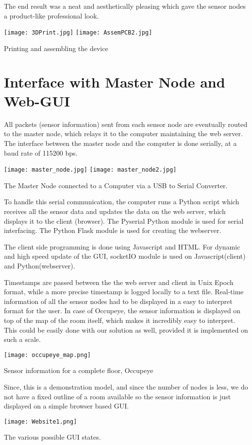The end result was a neat and aesthetically pleasing which gave the sensor nodes a product-like professional look.

\begin{center}
	
	
	\texttt{[image: 3DPrint.jpg]}
	\texttt{[image: AssemPCB2.jpg]}
	
	Printing and assembling the device
\end{center}



\section{Interface with Master Node and Web-GUI}

All packets (sensor information) sent from each sensor node are eventually routed to the master node, which relays it to the computer maintaining the web server. The interface between the master node and the computer is done serially, at a baud rate of 115200 bps.

\begin{center}
	\texttt{[image: master\_node.jpg]}
	\texttt{[image: master\_node2.jpg]}
	
	The Master Node connected to a Computer via a USB to Serial Converter. 	
\end{center}

 To handle this serial communication, the computer runs a Python script which receives all the sensor data and updates the data on the web server, which displays it to the client (browser). The Pyserial Python module is used for serial interfacing. The Python Flask module is used for creating the webserver. 
 
 The client side programming is done using Javascript and HTML. For dynamic and high speed update of the GUI, socketIO module is used on Javascript(client) and Python(webserver).
 
 Timestamps are passed between the the web server and client in Unix Epoch format, while a more precise timestamp is logged locally to a text file. Real-time information of all the sensor nodes had to be displayed in a easy to interpret format for the user. In case of Occupeye\cite{occupeye}, the sensor information is displayed on top of the map of the room itself, which makes it incredibly easy to interpret. This could be easily done with our solution as well, provided it is implemented on such a scale.

\begin{center}
	\texttt{[image: occupeye\_map.png]}
	
	Sensor information for a complete floor, Occupeye\cite{occupeye} 	
\end{center}

Since, this is a demonstration model, and since the number of nodes is less, we do not have a fixed outline of a room available so the sensor information is just displayed on a simple browser based GUI.


\begin{center}
	\texttt{[image: Website1.png]}
	
	The various possible GUI states.
\end{center}
